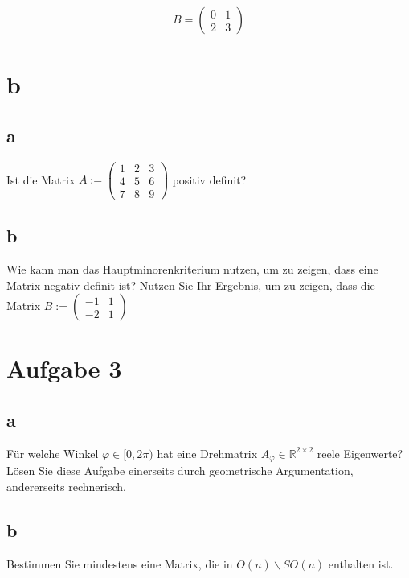 \begin{align*}
    B = \begin{pmatrix}
        0 & 1 \\
        2 & 3
    \end{pmatrix}
\end{align*}

\section{b}

\subsection{a}
Ist die Matrix $A := \begin{pmatrix}
    1 & 2 & 3 \\
    4 & 5 & 6 \\
    7 & 8 & 9
\end{pmatrix}$ positiv definit?

\subsection{b}
Wie kann man das Hauptminorenkriterium nutzen, um zu zeigen, dass eine Matrix negativ definit ist? Nutzen Sie Ihr Ergebnis, um zu zeigen, dass die Matrix $B := \begin{pmatrix}
    -1 & 1 \\
    -2 & 1
\end{pmatrix}$

\section{Aufgabe 3}

\subsection{a}

Für welche Winkel $\varphi \in [0, 2\pi)$ hat eine Drehmatrix $A_\varphi \in \mathbb{R}^{2 \times 2}$ reele Eigenwerte? Lösen Sie diese Aufgabe einerseits durch geometrische Argumentation, andererseits rechnerisch.

\subsection{b}

Bestimmen Sie mindestens eine Matrix, die in $O(n) \backslash SO(n)$ enthalten ist.